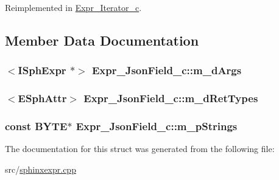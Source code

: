 Reimplemented in \hyperlink{structExpr__Iterator__c_a0ce1d42d09b500bf6c046266ba6d24c1}{Expr\-\_\-\-Iterator\-\_\-c}.



\subsection{Member Data Documentation}
\hypertarget{structExpr__JsonField__c_a290b2a33b4d32cae512157a1b1556fee}{
\subsubsection[{m\-\_\-d\-Args}]{$<${\bf I\-Sph\-Expr} $\ast$$>$ Expr\-\_\-\-Json\-Field\-\_\-c\-::m\-\_\-d\-Args\hspace{0.3cm}{\ttfamily [protected]}}}\label{structExpr__JsonField__c_a290b2a33b4d32cae512157a1b1556fee}
\hypertarget{structExpr__JsonField__c_a2826d27e9090d9b973ee4001e30301a7}{
\subsubsection[{m\-\_\-d\-Ret\-Types}]{$<${\bf E\-Sph\-Attr}$>$ Expr\-\_\-\-Json\-Field\-\_\-c\-::m\-\_\-d\-Ret\-Types\hspace{0.3cm}{\ttfamily [protected]}}}\label{structExpr__JsonField__c_a2826d27e9090d9b973ee4001e30301a7}
\hypertarget{structExpr__JsonField__c_abd3133d98c3d4afe6f24c8366c973d77}{
\subsubsection[{m\-\_\-p\-Strings}]{\setlength{\rightskip}{0pt plus 5cm}const {\bf B\-Y\-T\-E}$\ast$ Expr\-\_\-\-Json\-Field\-\_\-c\-::m\-\_\-p\-Strings\hspace{0.3cm}{\ttfamily [protected]}}}\label{structExpr__JsonField__c_abd3133d98c3d4afe6f24c8366c973d77}


The documentation for this struct was generated from the following file\-:\begin{DoxyCompactItemize}
\item 
src/\hyperlink{sphinxexpr_8cpp}{sphinxexpr.\-cpp}\end{DoxyCompactItemize}
